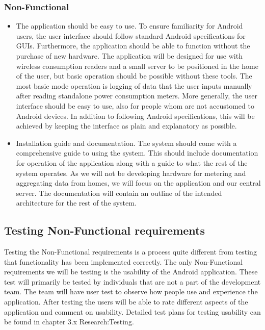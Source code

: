 \subsubsection{Non-Functional}

\begin{itemize}
\item The application should be easy to use.
To ensure familiarity for Android users, the user interface should follow standard Android specifications for GUIs. 
Furthermore, the application should be able to function without the purchase of new hardware. The application will be
designed for use with wireless consumption readers and a small server to be positioned in the home of the user, but basic
operation should be possible without these tools. The most basic mode operation is logging of data that 
the user inputs manually after reading standalone power consumption meters. 
More generally, the user interface should be easy to use, also for people whom are not accustomed to Android devices. In 
addition to following Android specifications, this will be achieved by keeping the interface as plain and explanatory as 
possible.
\end{itemize}

\begin{itemize}
\item Installation guide and documentation.
The system should come with a comprehensive guide to using the system. This should include documentation for operation of the
application along with a guide to what the rest of the system operates. As we will not be developing hardware for metering and 
aggregating data from homes, we will focus on the application and our central server. The documentation will contain an outline 
of the intended architecture for the rest of the system.
\end{itemize}

\subsection{Testing Non-Functional requirements}
Testing the Non-Functional requirements is a process quite different from testing that functionality has been implemented correctly.
The only Non-Functional requirements we will be testing is the usability of the Android application. These test will primarily be 
tested by individuals that are not a part of the development team. The team will have user test to observe how people use and experience 
the application. After testing the users will be able to rate different aspects of the application and comment on usability. Detailed 
test plans for testing usability can be found in chapter 3.x Research:Testing.


